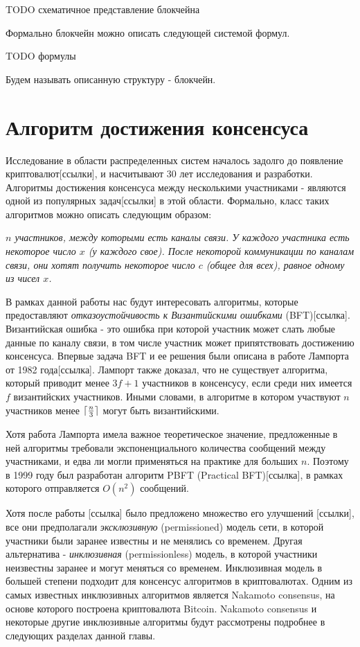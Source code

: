 TODO схематичное представление блокчейна

Формально блокчейн можно описать следующей системой формул.

TODO формулы

Будем называть описанную структуру - блокчейн.

\section{Алгоритм достижения консенсуса}
Исследование в области распределенных систем началось задолго до  появление криптовалют[ссылки], и насчитывают 30 лет исследования и разработки.
Алгоритмы достижения консенсуса между несколькими участниками - являются одной из популярных задач[ссылки] в этой области.
Формально, класс таких алгоритмов можно описать следующим образом:
\par \textit{
$n$ участников, между которыми есть каналы связи. У каждого участника есть некоторое число $x$ (у каждого свое).
После некоторой коммуникации по каналам связи, они хотят получить некоторое число $c$ (общее для всех),  равное одному из чисел $x$.
}

В рамках данной работы нас будут интересовать алгоритмы, которые предоставляют \textit{отказоустойчивость к Византийскими ошибками} (BFT)[ссылка].
Византийская ошибка - это ошибка при которой участник может слать любые данные по каналу связи, в том числе участник может припятствовать достижению консенсуса.
Впервые задача BFT и ее решения были описана в работе Лампорта от 1982 года[ссылка]. 
Лампорт также доказал, что не существует алгоритма, который приводит менее $3f+1$ участников в консенсусу, если среди них имеется $f$  византийских участников.
Иными словами, в алгоритме в котором участвуют $n$ участников менее $\lceil\frac{n}{3}\rceil$ могут быть византийскими.

Хотя работа Лампорта имела важное теоретическое значение, предложенные в ней алгоритмы требовали экспоненциального количества сообщений между участниками, 
и едва ли могли применяться на практике для больших $n$. Поэтому в 1999 году был разработан алгоритм PBFT (Practical BFT)[ссылка], 
в рамках которого отправляется $O(n^2)$  сообщений.

Хотя после работы [ссылка] было предложено множество его улучшений [ссылки], все они предполагали \textit{эксклюзивную} (permissioned) модель сети, 
в которой участники были заранее известны и не менялись со временем. Другая альтернатива - \textit{инклюзивная} (permissionless) модель, в которой участники
неизвестны заранее и могут меняться со временем. Инклюзивная модель в большей степени подходит для консенсус алгоритмов в криптовалютах. Одним из самых известных инклюзивных алгоритмов является Nakamoto consensus\cite{nakamoto}, на основе которого построена криптовалюта Bitcoin. Nakamoto consensus и некоторые другие инклюзивные алгоритмы будут рассмотрены подробнее в следующих разделах данной главы.

